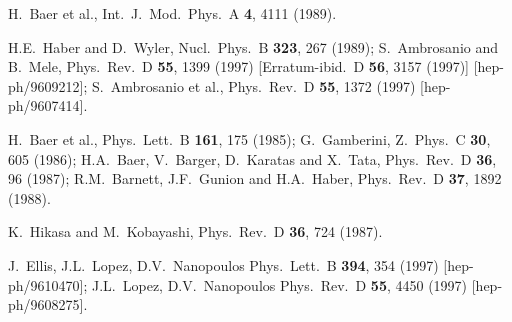 \documentclass[12pt]{article}
\def\stilde{\widetilde}
\def\NI{\stilde N_1}
\begin{document}
\begin{thebibliography}{999}
H.~Baer et al., 
  Int.\ J.\ Mod.\ Phys.\ A {\bf 4}, 4111 (1989).

H.E.~Haber and D.~Wyler, 
  Nucl.\ Phys.\ B {\bf 323}, 267 (1989);
S.~Ambrosanio and B.~Mele, 
  Phys.\ Rev.\ D {\bf 55}, 1399 (1997)
  [Erratum-ibid.\ D {\bf 56}, 3157 (1997)]
  [hep-ph/9609212];
S.~Ambrosanio et al., 
  Phys.\ Rev.\ D {\bf 55}, 1372 (1997)
  [hep-ph/9607414].

H.~Baer et al., 
  Phys.\ Lett.\ B {\bf 161}, 175 (1985);
G.~Gamberini, 
  Z.\ Phys.\ C {\bf 30}, 605 (1986);
H.A.~Baer, V.~Barger, D.~Karatas and X.~Tata,
  Phys.\ Rev.\ D {\bf 36}, 96 (1987);
R.M.~Barnett, J.F.~Gunion and H.A.~Haber, 
  Phys.\ Rev.\ D {\bf 37}, 1892 (1988).

K.~Hikasa and M.~Kobayashi,
  Phys.\ Rev.\ D {\bf 36}, 724 (1987).

J.~Ellis, J.L.~Lopez, D.V.~Nanopoulos 
  Phys.\ Lett.\ B {\bf 394}, 354 (1997)
  [hep-ph/9610470];
J.L.~Lopez, D.V.~Nanopoulos 
  Phys.\ Rev.\ D {\bf 55}, 4450 (1997)
  [hep-ph/9608275].


\end{thebibliography}
\end{document}

